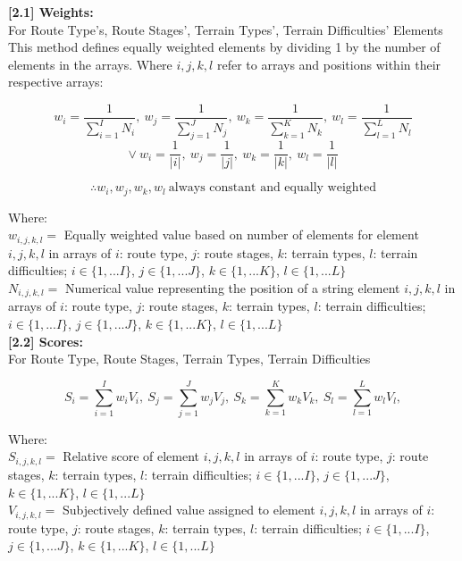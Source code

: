 \documentclass[11pt, english]{article}
\begin{document}
\newpage

	\textbf{[2.1] Weights:}\\

	For Route Type's, Route Stages', Terrain Types', Terrain Difficulties' Elements\\

	This method defines equally weighted elements by dividing 1 by the number of elements in the arrays. Where $i,j,k,l$ refer to arrays and positions within their respective arrays:

	$$w_{i}=\frac{1}{\sum^{I}_{i=1}N_{i}},\ w_{j}=\frac{1}{\sum^{J}_{j=1}N_{j}},\ w_{k}=\frac{1}{\sum^{K}_{k=1}N_{k}},\ w_{l}=\frac{1}{\sum^{L}_{l=1}N_{l}}$$
	$$\lor\ w_{i}=\frac{1}{\vert i\vert},\ w_{j}=\frac{1}{\vert j\vert},\ w_{k}=\frac{1}{\vert k\vert},\ w_{l}=\frac{1}{\vert l\vert}$$

	$$\therefore w_{i}, w_{j}, w_{k}, w_{l}\ \textrm{always constant and equally weighted}$$

	Where:\\
	$w_{i,j,k,l}=$ Equally weighted value based on number of elements for element $i,j,k,l$ in arrays of $i$: route type, $j$: route stages, $k$: terrain types, $l$: terrain difficulties; $i\in\{1,...I\}$, $j\in\{1,...J\}$, $k\in\{1,...K\}$, $l\in\{1,...L\}$\\
	$N_{i,j,k,l}=$ Numerical value representing the position of a string element $i,j,k,l$ in arrays of $i$: route type, $j$: route stages, $k$: terrain types, $l$: terrain difficulties; $i\in\{1,...I\}$, $j\in\{1,...J\}$, $k\in\{1,...K\}$, $l\in\{1,...L\}$\\

	\textbf{[2.2] Scores:}\\

	For Route Type, Route Stages, Terrain Types, Terrain Difficulties

	$$S_{i}=\sum^{I}_{i=1} w_{i}V_{i},\ S_{j}=\sum^{J}_{j=1} w_{j}V_{j},\ S_{k}=\sum^{K}_{k=1} w_{k}V_{k},\ S_{l}=\sum^{L}_{l=1} w_{l}V_{l},$$

	Where:\\
	$S_{i,j,k,l}=$ Relative score of element $i,j,k,l$ in arrays of $i$: route type, $j$: route stages, $k$: terrain types, $l$: terrain difficulties; $i\in\{1,...I\}$, $j\in\{1,...J\}$, $k\in\{1,...K\}$, $l\in\{1,...L\}$\\
	$V_{i,j,k,l}=$ Subjectively defined value assigned to element $i,j,k,l$ in arrays of $i$: route type, $j$: route stages, $k$: terrain types, $l$: terrain difficulties; $i\in\{1,...I\}$, $j\in\{1,...J\}$, $k\in\{1,...K\}$, $l\in\{1,...L\}$\\
\end{document}
